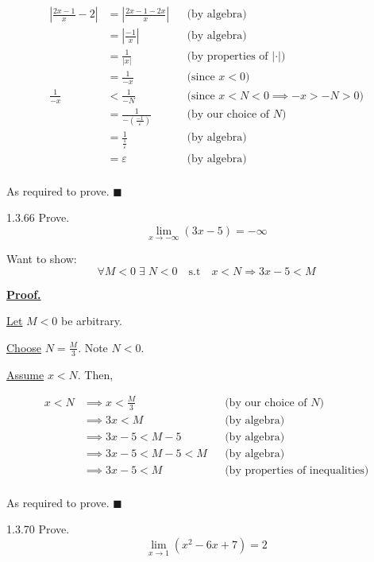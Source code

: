 \documentclass[]{article}
\begin{document}
\begin{align*}
    |\frac{2x-1}{x}-2| &= |\frac{2x-1 -2x}{x}| 
        && \text{(by algebra)} \\[6pt]
    &= |\frac{-1}{x}| 
        && \text{(by algebra)} \\[6pt]
    &= \frac{1}{|x|} 
        && \text{(by properties of $|\cdot|$)} \\[6pt]
    &= \frac{1}{-x} 
        && \text{(since $x<0$)} \\[6pt]
    \frac{1}{-x} &< \frac{1}{-N} 
        && \text{(since $x < N < 0 \implies -x > -N > 0$)} \\[6pt]
    &= \frac{1}{-(\frac{-1}{\varepsilon})} 
        && \text{(by our choice of $N$)} \\[6pt]
    &= \frac{1}{\frac{1}{\varepsilon}}
        && \text{(by algebra)} \\[6pt]
    &= \varepsilon
        && \text{(by algebra)} \\[6pt]
\end{align*}

As required to prove. $\blacksquare$
\begin{question}{1.3.66}
    Prove.
    \[
    \lim_{x\to -\infty} (3x-5) = -\infty
    \]
\end{question}
Want to show: 
\[
    \forall M < 0\;\exists\; N<0 \quad \text{s.t} \quad 
    x < N \Longrightarrow 3x-5 < M
\]

\underline{\bf{Proof.}}

\underline{Let} $M < 0$ be arbitrary.

\medbreak

\underline{Choose} $N = \frac{M}{3}$. Note $N < 0$.

\medbreak

\underline{Assume} $x < N$. Then, 

\begin{align*}
x < N &\implies x < \frac{M}{3} 
    && \text{(by our choice of $N$)} \\[2mm]
&\implies 3x < M 
    && \text{(by algebra)} \\[2mm]
&\implies 3x - 5 < M - 5
    && \text{(by algebra)}\\[2mm]
&\implies 3x - 5 < M - 5 < M
    && \text{(by algebra)}\\[2mm]
&\implies 3x - 5 <  M
    && \text{(by properties of inequalities)}\\[2mm]
\end{align*}

As required to prove. $\blacksquare$
\begin{question}{1.3.70}
    Prove.
    \[
    \lim_{x\to 1} (x^2-6x+7) = 2
    \]
\end{question}
\end{document}
